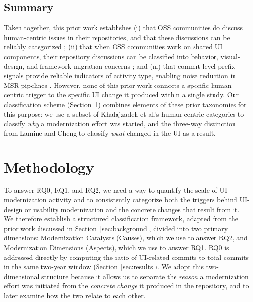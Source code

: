 \documentclass{article}
\begin{document}
\subsection{Summary}
Taken together, this prior work establishes (i) that OSS communities do
discuss human-centric issues in their repositories, and that these
discussions can be reliably categorized \cite{khalajzadeh2022how}; (ii)
that when OSS communities work on shared UI components, their repository
discussions can be classified into behavior, visual-design, and
framework-migration concerns \cite{lamine2022understanding}; and (iii)
that commit-level prefix signals provide reliable indicators of activity
type, enabling noise reduction in MSR pipelines \cite{levin2017,
herzig2013}. However, none of this prior work connects a specific
human-centric trigger to the specific UI change it produced within a
single study. Our classification scheme (Section~\ref{sec:method})
combines elements of these prior taxonomies for this purpose: we use a
subset of Khalajzadeh et al.'s human-centric categories to classify
\emph{why} a modernization effort was started, and the three-way
distinction from Lamine and Cheng to classify \emph{what} changed in the
UI as a result.

\newpage
\section{Methodology}
\label{sec:method}

To answer RQ0, RQ1, and RQ2, we need a way to quantify the scale of UI
modernization activity and to consistently categorize both the triggers
behind UI-design or usability modernization and the concrete changes that
result from it. We therefore establish a structured classification
framework, adapted from the prior work discussed in
Section~\ref{sec:background}, divided into two primary dimensions:
Modernization Catalysts (Causes), which we use to answer RQ2, and
Modernization Dimensions (Aspects), which we use to answer RQ1. RQ0 is
addressed directly by computing the ratio of UI-related commits to total
commits in the same two-year window (Section~\ref{sec:results}). We adopt
this two-dimensional structure because it allows us to separate the
\emph{reason} a modernization effort was initiated from the \emph{concrete
change} it produced in the repository, and to later examine how the two
relate to each other.
\end{document}
